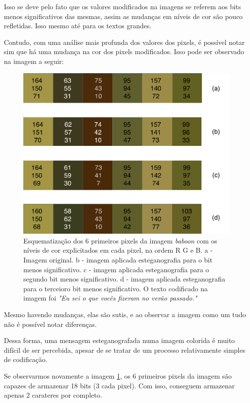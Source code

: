 \documentclass[conference]{IEEEtran}
\begin{document}
    Isso se deve pelo fato que os valores modificados na imagens se referem aos bits menos significativos das mesmas, assim as mudanças em níveis de cor são pouco refletidas.
    Isso mesmo até para os textos grandes.

    Contudo, com uma análise mais profunda dos valores dos pixels, é possível notar sim que há uma mudança na cor dos pixels modificados.
    Isso pode ser observado na imagem a seguir:

    \begin{figure}[ht]
        \centering
        \includegraphics[width=\linewidth]{baboonColors.png}
        \caption{Esquematização dos 6 primeiros pixels da imagem \textit{baboon} com os níveis de cor explicitados em cada pixel, na ordem R G e B. a - Imagem original. b - imagem aplicada esteganografia para o bit menos significativo. c - imagem aplicada esteganografia para o segundo bit menos significativo. d - imagem aplicada esteganografia para o terceioro bit menos significativo.
        O texto codificado na imagem foi \textit{"Eu sei o que vocês fizeram no verão passado."}}
        \label{fig:bbc}
    \end{figure}

    Mesmo havendo mudanças, elas são sutis, e ao observar a imagem como um tudo não é possível notar diferenças.

    Dessa forma, uma mensagem esteganografada numa imagem colorida é muito difícil de ser percebida, apesar de se tratar de um processo relativamente simples de codificação.

    Se observarmos novamente a imagem \ref{fig:bbc}, os 6 primeiros pixels da imagem são capazes de armazenar 18 bits (3 cada pixel).
    Com isso, conseguem armazenar apenas 2 carateres por completo.
\end{document}
